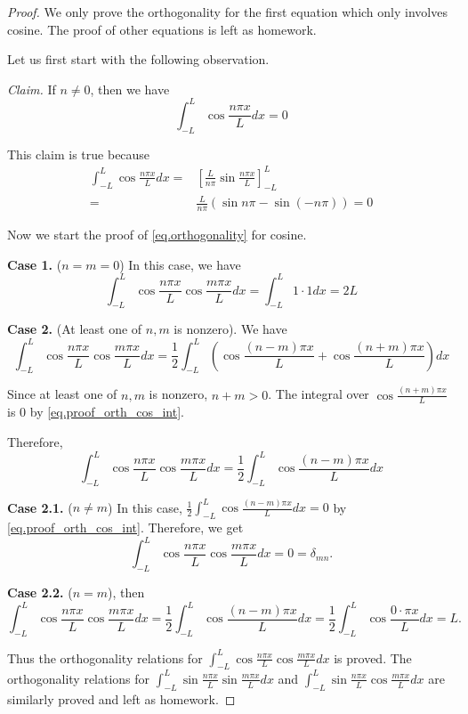 \begin{proof}
We only prove the orthogonality for the first equation which only involves cosine. The proof of other equations is left as homework. 

Let us first start with the following observation.

\textit{Claim.} If $n\neq 0$, then we have
\begin{equation}\label{eq.proof_orth_cos_int}
    \int_{-L}^L \cos \frac{n \pi x}{L} dx = 0
\end{equation}

This claim is true because
\begin{equation}\label{eq.proof_orth_cos_int_1}
    \begin{split}
        \int_{-L}^L \cos \frac{n \pi x}{L} dx =& \left[\frac{L}{n\pi}\sin \frac{n \pi x}{L}\right]^{L}_{-L} 
        \\
        =& \frac{L}{n\pi} (\sin n\pi - \sin (- n\pi) ) = 0
    \end{split}
\end{equation}

Now we start the proof of \eqref{eq.orthogonality} for cosine.

\textbf{Case 1.} ($n=m=0$) In this case, we have
$$
\int_{-L}^L \cos \frac{n \pi x}{L} \cos \frac{m \pi x}{L} d x=\int_{-L}^L 1 \cdot 1 d x=2 L
$$

\textbf{Case 2.} (At least one of $n, m$ is nonzero). We have
$$
\int_{-L}^L \cos \frac{n \pi x}{L} \cos \frac{m \pi x}{L} d x=\frac{1}{2} \int_{-L}^L\left(\cos \frac{(n-m) \pi x}{L}+\cos \frac{(n+m) \pi x}{L}\right) d x
$$

Since at least one of $n, m$ is nonzero, $n+m > 0$. The integral over $\cos \frac{(n+m) \pi x}{L}$ is $0$ by \eqref{eq.proof_orth_cos_int}.

Therefore,
$$
\int_{-L}^L \cos \frac{n \pi x}{L} \cos \frac{m \pi x}{L} d x=\frac{1}{2} \int_{-L}^L\cos \frac{(n-m) \pi x}{L} d x
$$

\textbf{Case 2.1.} ($n \neq m$) In this case, $\frac{1}{2} \int_{-L}^L\cos \frac{(n-m) \pi x}{L} d x = 0$ by \eqref{eq.proof_orth_cos_int}. Therefore, we get 
$$
\int_{-L}^L \cos \frac{n \pi x}{L} \cos \frac{m \pi x}{L} d x = 0 =\delta_{m n}.
$$


\textbf{Case 2.2.} ($n = m$), then
$$
\int_{-L}^L \cos \frac{n \pi x}{L} \cos \frac{m \pi x}{L} d x =\frac{1}{2} \int_{-L}^L\cos \frac{(n-m) \pi x}{L} d x =\frac{1}{2} \int_{-L}^L \cos \frac{0 \cdot \pi x}{L} d x=L .
$$

Thus the orthogonality relations for $\int_{-L}^L \cos \frac{n \pi x}{L} \cos \frac{m \pi x}{L} d x$ is proved. The orthogonality relations for $\int_{-L}^L \sin \frac{n \pi x}{L} \sin \frac{m \pi x}{L} d x$ and $\int_{-L}^L \sin \frac{n \pi x}{L} \cos \frac{m \pi x}{L} d x$ are similarly proved and left as homework.
\end{proof}



